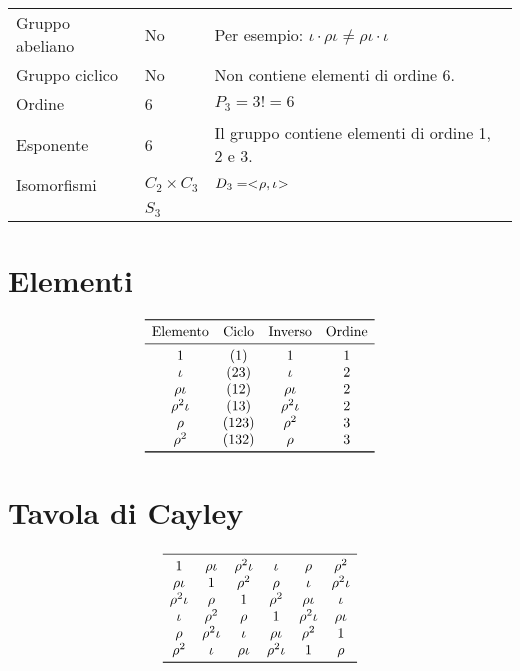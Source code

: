 \begin{center}
	\begin{tabular}{lll}
		Gruppo abeliano & No & Per esempio: $\iota \cdot \rho\iota \neq \rho\iota \cdot \iota$ \\
		Gruppo ciclico & No & Non contiene elementi di ordine 6. \\
		Ordine & 6 & $P_3 = 3! = 6$\\
		Esponente & 6 & Il gruppo contiene elementi di ordine 1, 2 e 3. \\
		Isomorfismi & $C_2 \times C_3$ & $D_3 = < \negmedspace \rho, \iota \negmedspace >$  \\
		& $S_3$ & 
	\end{tabular}
\end{center}

\section{Elementi}
\label{sec:d3_elementi}

\begin{center}
	\[
	\begin{array}{cccc}
		\toprule
		\text{Elemento} & \text{Ciclo} & \text{Inverso} & \text{Ordine} \\
		\midrule
		1 & (1)	& 1 & 1 \\
		\iota & (23) & \iota & 2 \\
		\rho\iota & (12) & \rho\iota & 2 \\
		\rho^2\iota & (13) & \rho^2\iota & 2 \\
		\rho & (123) & \rho^2 & 3 \\
		\rho^2 & (132) & \rho & 3 \\
		\bottomrule
	\end{array}
	\]
\end{center}

\section{Tavola di Cayley}
\label{sec:d3_tavola_caylay}

\begin{center}
	\[
	\begin{array}{cccccc}
		\midrule
		1 & \rho\iota & \rho^2\iota & \iota & \rho & \rho^2 \\
		\rho\iota & 1 & \rho^2 & \rho & \iota & \rho^2\iota \\
		\rho^2\iota & \rho & 1 & \rho^2 & \rho\iota & \iota \\
		\iota & \rho^2 & \rho & 1 & \rho^2\iota & \rho\iota \\
		\rho & \rho^2\iota & \iota & \rho\iota & \rho^2 & 1 \\
		\rho^2 & \iota & \rho\iota & \rho^2\iota & 1 & \rho \\
		\bottomrule
	\end{array}
	\]
\end{center}

